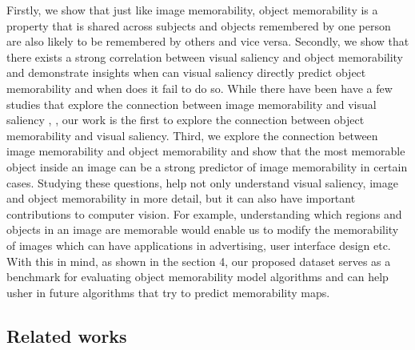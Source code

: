 Firstly, we show that just like image memorability, object memorability is a property that is shared across subjects and objects remembered by one person are also likely to be remembered by others and vice versa. Secondly, we show that there exists a strong correlation between visual saliency and object memorability and demonstrate insights when can visual saliency directly predict object memorability and when does it fail to do so. While there have been have a few studies that explore the connection between image memorability and visual saliency \cite{zoya15}, \cite{lemeur13}, our work is the first to explore the connection between object memorability and visual saliency. Third, we explore the connection between image memorability and object memorability and show that the most memorable object inside an image can be a strong predictor of image memorability in certain cases. Studying these questions, help not only understand visual saliency, image and object memorability in more detail, but it can also have important contributions to computer vision. For example, understanding which regions and objects in an image are memorable would enable us to modify the memorability of images which can have applications in advertising, user interface design etc. With this in mind, as shown in the section 4, our proposed dataset serves as a benchmark for evaluating object memorability model algorithms and can help usher in future algorithms that try to predict memorability maps.


\subsection{Related works}
 